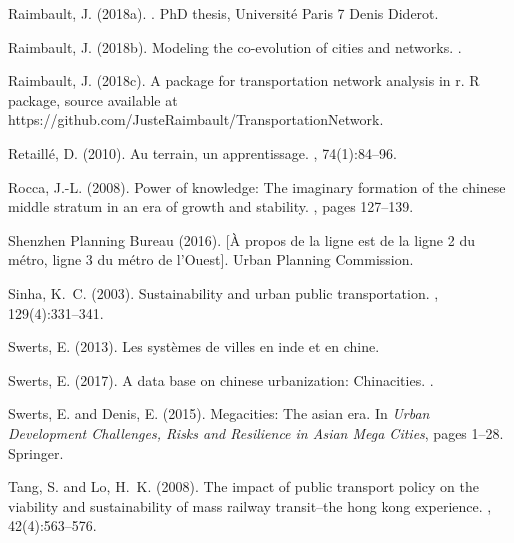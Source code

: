 \begin{thebibliography}{}
Raimbault, J. (2018a).
.
\newblock PhD thesis, Universit{\'e} Paris 7 Denis Diderot.

Raimbault, J. (2018b).
\newblock Modeling the co-evolution of cities and networks.
.

Raimbault, J. (2018c).
\newblock A package for transportation network analysis in r.
\newblock R package, source available at
  https://github.com/JusteRaimbault/TransportationNetwork.

Retaill{\'e}, D. (2010).
\newblock Au terrain, un apprentissage.
, 74(1):84--96.

Rocca, J.-L. (2008).
\newblock Power of knowledge: The imaginary formation of the chinese middle
  stratum in an era of growth and stability.
, pages
  127--139.

{Shenzhen Planning Bureau} (2016).
\newblock
  {
  [{\`A} propos de la ligne est de la ligne 2 du m{\'e}tro, ligne 3 du
  m{\'e}tro de l'Ouest]}.
\newblock Urban Planning Commission.

Sinha, K.~C. (2003).
\newblock Sustainability and urban public transportation.
, 129(4):331--341.

Swerts, E. (2013).
\newblock Les syst{\`e}mes de villes en inde et en chine.

Swerts, E. (2017).
\newblock A data base on chinese urbanization: Chinacities.
.

Swerts, E. and Denis, E. (2015).
\newblock Megacities: The asian era.
\newblock In {\em Urban Development Challenges, Risks and Resilience in Asian
  Mega Cities}, pages 1--28. Springer.

Tang, S. and Lo, H.~K. (2008).
\newblock The impact of public transport policy on the viability and
  sustainability of mass railway transit--the hong kong experience.
,
  42(4):563--576.


\end{thebibliography}
